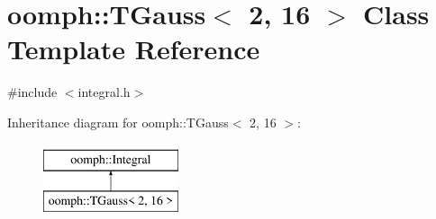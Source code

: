 \hypertarget{classoomph_1_1TGauss_3_012_00_0116_01_4}{}\section{oomph\+:\+:T\+Gauss$<$ 2, 16 $>$ Class Template Reference}
\label{classoomph_1_1TGauss_3_012_00_0116_01_4}


{\ttfamily \#include $<$integral.\+h$>$}

Inheritance diagram for oomph\+:\+:T\+Gauss$<$ 2, 16 $>$\+:\begin{figure}[H]
\begin{center}
\leavevmode
\includegraphics[height=2.000000cm]{classoomph_1_1TGauss_3_012_00_0116_01_4}
\end{center}
\end{figure}
